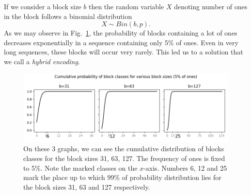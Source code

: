 If we consider a block size $b$ then the random variable $X$ denoting number of ones in the
block follows a binomial distribution $$X \sim Bin(b,p).$$ As we may observe in
Fig.~\ref{obr:hybridEncodingDistribution}, the probability of blocks
containing a lot of ones decreases exponentially in a sequence containing only 5\% of ones.
Even in very long sequences, these blocks will occur very rarely. This led us to a solution
that we call a \textit{hybrid encoding}.

\begin{figure}
	\centerline{
		\includegraphics[width=\textwidth]{images/hybrid_encoding_motivation}
	}
	\caption[TODO]{On these 3 graphs, we can see the cumulative distribution
    of blocks classes for the block sizes 31, 63, 127. The frequency of ones is
    fixed to 5\%. Note the marked classes on the $x$-axis. Numbers 6, 12 and
    25 mark the place up to which 99\% of probability distribution lies for
    the block sizes 31, 63 and 127 respectively.
	}
	\label{obr:hybridEncodingDistribution}
\end{figure}


